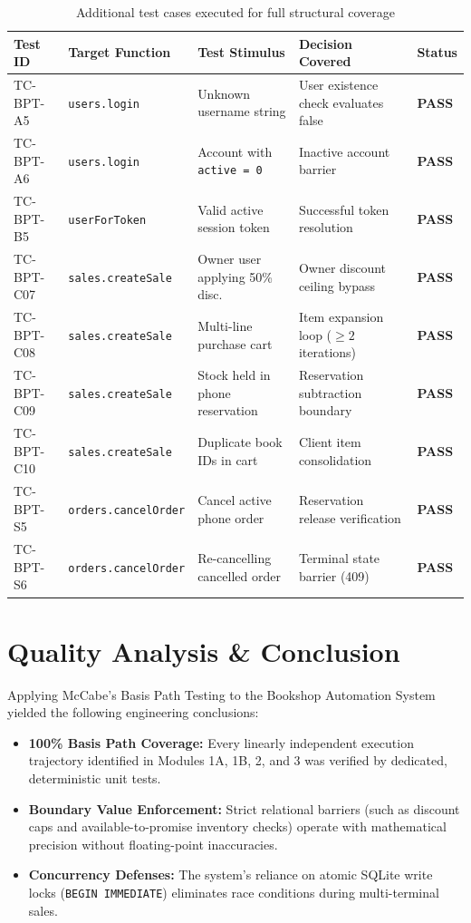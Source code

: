 \documentclass[12pt, a4paper]{report}
\begin{document}
\begin{table}[H]
\centering
\footnotesize
\begin{tabularx}{\textwidth}{L{2.5cm} L{3.5cm} L{4.5cm} L{4.0cm} C{1.2cm}}
\toprule
\textbf{Test ID} & \textbf{Target Function} & \textbf{Test Stimulus} & \textbf{Decision Covered} & \textbf{Status} \\
\midrule
TC-BPT-A5 & \texttt{users.login} & Unknown username string & User existence check evaluates false & \textbf{PASS} \\
TC-BPT-A6 & \texttt{users.login} & Account with \texttt{active = 0} & Inactive account barrier & \textbf{PASS} \\
TC-BPT-B5 & \texttt{userForToken} & Valid active session token & Successful token resolution & \textbf{PASS} \\
TC-BPT-C07 & \texttt{sales.createSale} & Owner user applying 50\% disc. & Owner discount ceiling bypass & \textbf{PASS} \\
TC-BPT-C08 & \texttt{sales.createSale} & Multi-line purchase cart & Item expansion loop ($\ge 2$ iterations) & \textbf{PASS} \\
TC-BPT-C09 & \texttt{sales.createSale} & Stock held in phone reservation & Reservation subtraction boundary & \textbf{PASS} \\
TC-BPT-C10 & \texttt{sales.createSale} & Duplicate book IDs in cart & Client item consolidation & \textbf{PASS} \\
TC-BPT-S5 & \texttt{orders.cancelOrder} & Cancel active phone order & Reservation release verification & \textbf{PASS} \\
TC-BPT-S6 & \texttt{orders.cancelOrder} & Re-cancelling cancelled order & Terminal state barrier (409) & \textbf{PASS} \\
\bottomrule
\end{tabularx}
\caption{Additional test cases executed for full structural coverage}
\label{tab:additional}
\end{table}

\chapter{Quality Analysis \& Conclusion}
Applying McCabe's Basis Path Testing to the Bookshop Automation System yielded the following engineering conclusions:
\begin{itemize}[leftmargin=1.5em]
  \item \textbf{100\% Basis Path Coverage:} Every linearly independent execution trajectory identified in Modules 1A, 1B, 2, and 3 was verified by dedicated, deterministic unit tests.
  \item \textbf{Boundary Value Enforcement:} Strict relational barriers (such as discount caps and available-to-promise inventory checks) operate with mathematical precision without floating-point inaccuracies.
  \item \textbf{Concurrency Defenses:} The system's reliance on atomic SQLite write locks (\texttt{BEGIN IMMEDIATE}) eliminates race conditions during multi-terminal sales.
\end{itemize}
\end{document}
